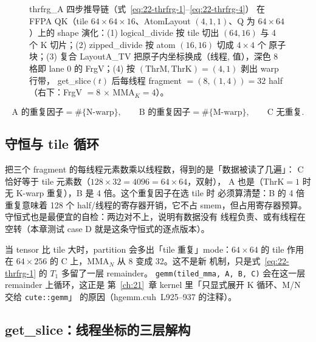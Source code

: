 \begin{figure}[H]
\caption{thrfrg\_A 四步推导链（式~\eqref{eq:22-thrfrg-1}--\eqref{eq:22-thrfrg-4}）
在 FFPA QK（tile $64\times64\times16$、AtomLayout $(4,1,1)$、Q 为
$64\times64$）上的 shape 演化：(1) logical\_divide 按 tile 切出 $(64,16)$
与 4 个 K 切片；(2) zipped\_divide 按 atom $(16,16)$ 切成 $4\times4$ 个
原子块；(3) 复合 LayoutA\_TV 把原子内坐标换成（线程, 值），深色 8 格即
lane 0 的 FrgV；(4) 按 $(\mathrm{ThrM},\mathrm{ThrK})=(4,1)$ 剥出 warp 行带，
get\_slice$(t)$ 后每线程 fragment $=(8,(1,4))=32$ half（右下：FrgV $=8$
$\times$ $\mathrm{MMA}_K=4$）。}
\label{fig:22-thrfrg-chain}
\end{figure}

\begin{equation}
  \text{A 的重复因子} = \#\{\text{N-warp}\},\qquad
  \text{B 的重复因子} = \#\{\text{M-warp}\},\qquad
  \text{C 无重复} .
  \label{eq:22-dup}
\end{equation}

\subsection{守恒与 tile 循环}

把三个 fragment 的每线程元素数乘以线程数，得到的是「数据被读了几遍」：
C 恰好等于 tile 元素数（$128\times32 = 4096 = 64\times64$，双射），
A 也是（$\mathrm{ThrK}=1$ 时无 K-warp 重复），B 是 4 倍。这个重复因子在选 tile 时
必须算清楚：B 的 4 倍重复意味着 128 个 half/线程的寄存器开销，它不占
smem，但占用寄存器预算。守恒式也是最便宜的自检：两边对不上，说明有数据没有
线程负责、或有线程在空转（本章测试 case D 就是这条守恒式的逐点版本）。

当 tensor 比 tile 大时，partition 会多出「tile 重复」mode：$64\times64$ 的
tile 作用在 $64\times256$ 的 C 上，$\mathrm{MMA}_N$ 从 8 变成 32。这不是新
机制，只是式~\eqref{eq:22-thrfrg-1} 的 $T_1$ 多留了一层 remainder。
\texttt{gemm\allowbreak{}(tiled\_\allowbreak{}mma,\allowbreak{} A,\allowbreak{} B,\allowbreak{} C)} 会在这一层 remainder 上循环，这正是
第~\ref{ch:21}~章 kernel 里「只显式展开 K 循环、M/N 交给 \texttt{cute::gemm}」
的原因（hgemm.cuh~L925--937 的注释）。

\subsection{get\_slice：线程坐标的三层解构}

